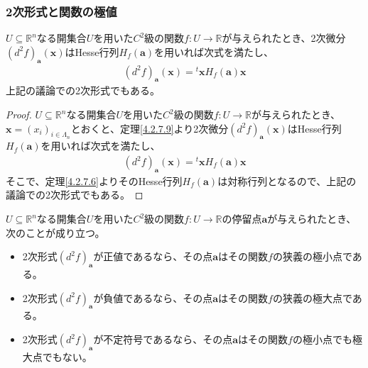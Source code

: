 \documentclass[dvipdfmx]{jsarticle}
\begin{document}
\subsubsection{2次形式と関数の極値}%
\begin{thm}\label{4.4.3.10}
$U \subseteq \mathbb{R}^{n}$なる開集合$U$を用いた$C^{2}$級の関数$f:U \rightarrow \mathbb{R}$が与えられたとき、2次微分$\left( d^{2}f \right)_{\mathbf{a}}\left( \mathbf{x} \right)$はHesse行列$H_{f}\left( \mathbf{a} \right)$を用いれば次式を満たし、
\begin{align*}
\left( d^{2}f \right)_{\mathbf{a}}\left( \mathbf{x} \right) ={}^t \mathbf{x}H_{f}\left( \mathbf{a} \right)\mathbf{x}
\end{align*}
上記の議論での2次形式でもある。
\end{thm}
\begin{proof}
$U \subseteq \mathbb{R}^{n}$なる開集合$U$を用いた$C^{2}$級の関数$f:U \rightarrow \mathbb{R}$が与えられたとき、$\mathbf{x} = \left( x_{i} \right)_{i \in \varLambda_{n}}$とおくと、定理\ref{4.2.7.9}より2次微分$\left( d^{2}f \right)_{\mathbf{a}}\left( \mathbf{x} \right)$はHesse行列$H_{f}\left( \mathbf{a} \right)$を用いれば次式を満たし、
\begin{align*}
\left( d^{2}f \right)_{\mathbf{a}}\left( \mathbf{x} \right) ={}^t \mathbf{x}H_{f}\left( \mathbf{a} \right)\mathbf{x}
\end{align*}
そこで、定理\ref{4.2.7.6}よりそのHesse行列$H_{f}\left( \mathbf{a} \right)$は対称行列となるので、上記の議論での2次形式でもある。
\end{proof}
\begin{thm}\label{4.4.3.11}
$U \subseteq \mathbb{R}^{n}$なる開集合$U$を用いた$C^{2}$級の関数$f:U \rightarrow \mathbb{R}$の停留点$\mathbf{a}$が与えられたとき、次のことが成り立つ。
\begin{itemize}
\item
  2次形式$\left( d^{2}f \right)_{\mathbf{a}}$が正値であるなら、その点$\mathbf{a}$はその関数$f$の狭義の極小点である。
\item
  2次形式$\left( d^{2}f \right)_{\mathbf{a}}$が負値であるなら、その点$\mathbf{a}$はその関数$f$の狭義の極大点である。
\item
  2次形式$\left( d^{2}f \right)_{\mathbf{a}}$が不定符号であるなら、その点$\mathbf{a}$はその関数$f$の極小点でも極大点でもない。
\end{itemize}
\end{thm}
\end{document}
